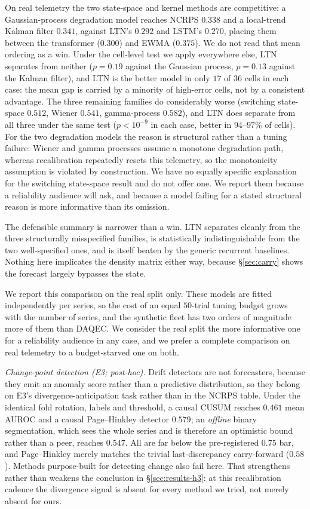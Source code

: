 \documentclass[journal]{IEEEtran}
\begin{document}
On real telemetry the two state-space and kernel methods are competitive: a
Gaussian-process degradation model reaches NCRPS $0.338$ and a local-trend Kalman
filter $0.341$, against LTN's $0.292$ and LSTM's $0.270$, placing them between the
transformer ($0.300$) and EWMA ($0.375$). We do not read that mean ordering as a win.
Under the cell-level test we apply everywhere else, LTN separates from neither
($p = 0.19$ against the Gaussian process, $p = 0.13$ against the Kalman filter), and
LTN is the better model in only $17$ of $36$ cells in each case: the mean gap is
carried by a minority of high-error cells, not by a consistent advantage. The three remaining
families do considerably worse (switching state-space $0.512$, Wiener $0.541$,
gamma-process $0.582$), and LTN does separate from all three under the same test
($p < 10^{-9}$ in each case, better in $94$--$97\%$ of cells). For the two
degradation models the reason is structural rather than a tuning failure: Wiener and
gamma processes assume a monotone degradation path, whereas recalibration repeatedly
resets this telemetry, so the monotonicity assumption is violated by construction. We
have no equally specific explanation for the switching state-space result and do not
offer one. We report them because a reliability audience will ask, and
because a model failing for a stated structural reason is more informative than its
omission.

The defensible summary is narrower than a win. LTN separates cleanly from the three
structurally misspecified families, is statistically indistinguishable from the two
well-specified ones, and is itself beaten by the generic recurrent baselines. Nothing
here implicates the density matrix either way, because \S\ref{sec:carry} shows the
forecast largely bypasses the state.

We report this comparison on the real split only. These models are fitted
independently per series, so the cost of an equal $50$-trial tuning budget grows with
the number of series, and the synthetic fleet has two orders of magnitude more of them
than DAQEC\@. We consider the real split the more informative one for a reliability
audience in any case, and we prefer a complete comparison on real telemetry to a
budget-starved one on both.

\emph{Change-point detection (E3; post-hoc).} Drift detectors are not forecasters, because they emit
an anomaly score rather than a predictive distribution, so they belong on E3's
divergence-anticipation task rather than in the NCRPS table. Under the identical fold
rotation, labels and threshold, a causal CUSUM reaches $0.461$ mean AUROC and a causal
Page--Hinkley detector $0.579$; an \emph{offline} binary segmentation, which sees the
whole series and is therefore an optimistic bound rather than a peer, reaches $0.547$.
All are far below the pre-registered $0.75$ bar, and Page--Hinkley merely matches the
trivial last-discrepancy carry-forward ($0.58$). Methods purpose-built for detecting
change also fail here. That strengthens rather than weakens the conclusion in
\S\ref{sec:results-h3}: at this recalibration cadence the divergence signal is absent
for every method we tried, not merely absent for ours.
\end{document}
